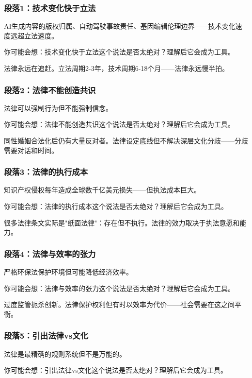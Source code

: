 \documentclass[a4paper,12pt]{book}
\newenvironment{motivation}{\begin{tcolorbox}[colback=gray!10,colframe=gray!60,title=\textit{动机}]\small\itshape}{\end{tcolorbox}}
\begin{document}
\begin{motivation}
\begin{motivation}
	\subsubsection*{段落1：技术变化快于立法}
	AI生成内容的版权归属、自动驾驶事故责任、基因编辑伦理边界——技术变化速度远超立法速度。
	\begin{tcolorbox}[colback=yellow!5, title=\textit{读者行为预测}]
		你可能会想：技术变化快于立法这个说法是否太绝对？理解后它会成为工具。
	\end{tcolorbox}

法律永远在追赶。立法周期2-3年，技术周期6-18个月——法律永远慢半拍。

	\subsubsection*{段落2：法律不能创造共识}
	法律可以强制行为但不能强制信念。
	\begin{tcolorbox}[colback=yellow!5, title=\textit{读者行为预测}]
		你可能会想：法律不能创造共识这个说法是否太绝对？理解后它会成为工具。
	\end{tcolorbox}

同性婚姻合法化后仍有大量反对者。法律设定底线但不解决深层文化分歧——分歧需要对话和时间。

	\subsubsection*{段落3：法律的执行成本}
	知识产权侵权每年造成全球数千亿美元损失——但执法成本巨大。
	\begin{tcolorbox}[colback=yellow!5, title=\textit{读者行为预测}]
		你可能会想：法律的执行成本这个说法是否太绝对？理解后它会成为工具。
	\end{tcolorbox}

很多法律条文实际是"纸面法律"：存在但不执行。法律的效力取决于执法意愿和能力。

	\subsubsection*{段落4：法律与效率的张力}
	严格环保法保护环境但可能降低经济效率。
	\begin{tcolorbox}[colback=yellow!5, title=\textit{读者行为预测}]
		你可能会想：法律与效率的张力这个说法是否太绝对？理解后它会成为工具。
	\end{tcolorbox}

过度监管扼杀创新。法律保护权利但有时以效率为代价——社会需要在这之间平衡。

	\subsubsection*{段落5：引出法律vs文化}
	法律是最精确的规则系统但不是万能的。
	\begin{tcolorbox}[colback=yellow!5, title=\textit{读者行为预测}]
		你可能会想：引出法律vs文化这个说法是否太绝对？理解后它会成为工具。
	\end{tcolorbox}


\end{motivation}
\end{motivation}
\end{document}
